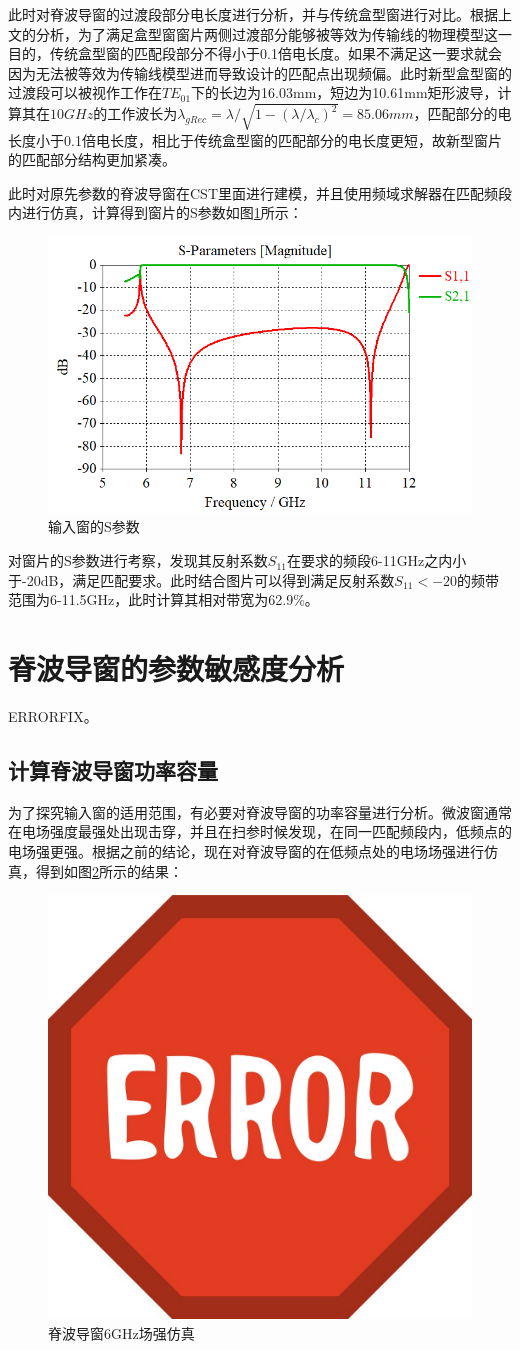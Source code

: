 \documentclass[master]{thesis-uestc}
\begin{document}
此时对脊波导窗的过渡段部分电长度进行分析，并与传统盒型窗进行对比。根据上文的分析，为了满足盒型窗窗片两侧过渡部分能够被等效为传输线的物理模型这一目的，传统盒型窗的匹配段部分不得小于0.1倍电长度。如果不满足这一要求就会因为无法被等效为传输线模型进而导致设计的匹配点出现频偏。此时新型盒型窗的过渡段可以被视作工作在$TE_{01}$下的长边为16.03mm，短边为10.61mm矩形波导，计算其在$10GHz$的工作波长为$\lambda_{gRec}=\lambda / \sqrt{1-(\lambda / \lambda_c)^2}=85.06mm$，匹配部分的电长度小于0.1倍电长度，相比于传统盒型窗的匹配部分的电长度更短，故新型窗片的匹配部分结构更加紧凑。

此时对原先参数的脊波导窗在CST里面进行建模，并且使用频域求解器在匹配频段内进行仿真，计算得到窗片的S参数如图\ref{fig:输入窗的S参数}所示：

\begin{figure}[!htb]
    \centering
    \includegraphics[width=0.5\linewidth]{pic/chapter3/脊波导窗S参数.png}
    \caption{输入窗的S参数}
    \label{fig:输入窗的S参数}
\end{figure}
对窗片的S参数进行考察，发现其反射系数$S_{11}$在要求的频段6-11GHz之内小于-20dB，满足匹配要求。此时结合图片可以得到满足反射系数$S_{11}<-20$的频带范围为6-11.5GHz，此时计算其相对带宽为62.9\%。
\section{脊波导窗的参数敏感度分析}
ERRORFIX。
\subsection{计算脊波导窗功率容量}
为了探究输入窗的适用范围，有必要对脊波导窗的功率容量进行分析。微波窗通常在电场强度最强处出现击穿，并且在扫参时候发现，在同一匹配频段内，低频点的电场强更强。根据之前的结论，现在对脊波导窗的在低频点处的电场场强进行仿真，得到如图\ref{fig:脊波导窗低频点场强仿真}所示的结果：
\begin{figure}[!htb]
    \centering
    \includegraphics[width=0.25\linewidth]{pic/ERROR.jpg}
    \caption{脊波导窗6GHz场强仿真}
    \label{fig:脊波导窗低频点场强仿真}
\end{figure}
\end{document}
